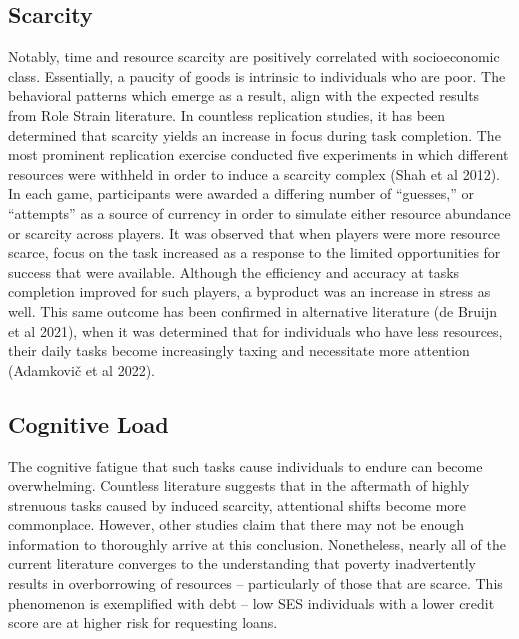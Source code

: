 \documentclass[
]{report}
\begin{document}
\hypertarget{scarcity}{%
\subsection{Scarcity}\label{scarcity}}

Notably, time and resource scarcity are positively correlated with
socioeconomic class. Essentially, a paucity of goods is intrinsic to
individuals who are poor. The behavioral patterns which emerge as a
result, align with the expected results from Role Strain literature. In
countless replication studies, it has been determined that scarcity
yields an increase in focus during task completion. The most prominent
replication exercise conducted five experiments in which different
resources were withheld in order to induce a scarcity complex (Shah et
al 2012). In each game, participants were awarded a differing number of
``guesses,'' or ``attempts'' as a source of currency in order to
simulate either resource abundance or scarcity across players. It was
observed that when players were more resource scarce, focus on the task
increased as a response to the limited opportunities for success that
were available. Although the efficiency and accuracy at tasks completion
improved for such players, a byproduct was an increase in stress as
well. This same outcome has been confirmed in alternative literature (de
Bruijn et al 2021), when it was determined that for individuals who have
less resources, their daily tasks become increasingly taxing and
necessitate more attention (Adamkovič et al 2022).

\hypertarget{cognitive-load}{%
\subsection{Cognitive Load}\label{cognitive-load}}

The cognitive fatigue that such tasks cause individuals to endure can
become overwhelming. Countless literature suggests that in the aftermath
of highly strenuous tasks caused by induced scarcity, attentional shifts
become more commonplace. However, other studies claim that there may not
be enough information to thoroughly arrive at this conclusion.
Nonetheless, nearly all of the current literature converges to the
understanding that poverty inadvertently results in overborrowing of
resources -- particularly of those that are scarce. This phenomenon is
exemplified with debt -- low SES individuals with a lower credit score
are at higher risk for requesting loans.
\end{document}
